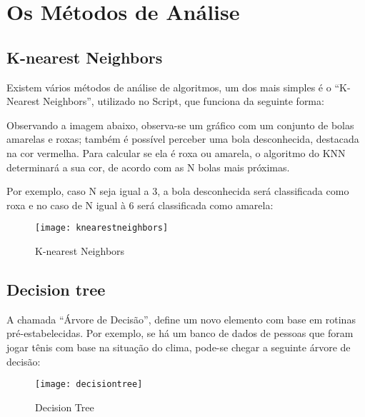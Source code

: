 \chapter{Os Métodos de Análise}
\label{chapter:os_metodos_de_analise}

\section{\textbf{K-nearest Neighbors}}

Existem vários métodos de análise de algoritmos, um dos mais simples é o “K-Nearest Neighbors”, utilizado no Script, que funciona da seguinte forma:

Observando a imagem abaixo, observa-se um gráfico com um conjunto de bolas amarelas e roxas; também é possível perceber uma bola desconhecida, destacada na cor vermelha. Para calcular se ela é roxa ou amarela, o algoritmo do KNN determinará a sua cor, de acordo com as N bolas mais próximas.

Por exemplo, caso N seja igual a 3, a bola desconhecida será classificada como roxa e no caso de N igual à 6 será classificada como amarela:

\begin{figure}[!htb]
\begin{center}
\caption{K-nearest Neighbors}
\texttt{[image: knearestneighbors]}
\end{center}
\cite{KNN}
\end{figure}




\section{\textbf{Decision tree}}

A chamada “Árvore de Decisão”, define um novo elemento com base em rotinas pré-estabelecidas. Por exemplo, se há um banco de dados de pessoas que foram jogar tênis com base na situação do clima, pode-se chegar a seguinte árvore de decisão:


\begin{figure}[!htb]
\begin{center}
\caption{Decision Tree}
\texttt{[image: decisiontree]}
\end{center}
\end{figure}

